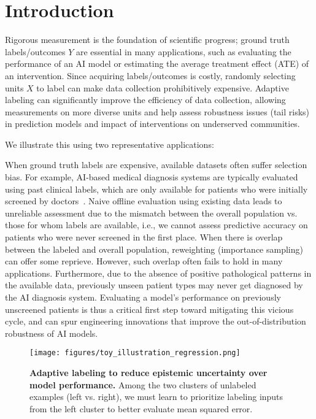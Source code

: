 
 
\section{Introduction}
\label{sec:introduction}


Rigorous measurement is the foundation of scientific progress;
ground truth labels/outcomes $Y$ are essential in many applications, such as evaluating the performance of an AI model or estimating the average treatment effect (ATE) of an intervention. 
Since acquiring labels/outcomes is costly, randomly selecting  units $X$ to label can make data collection prohibitively expensive. 
Adaptive labeling can significantly improve the efficiency of data collection,
allowing measurements on more diverse units
and help assess robustness issues (tail risks) in prediction models and impact of interventions on 
underserved communities.

We illustrate this using two representative applications:

 
\begin{example}
When ground truth labels are expensive, available datasets often suffer selection bias. For example, AI-based medical diagnosis systems are typically evaluated using past clinical labels, which are only available for patients who were initially screened by doctors~\citep{Institute03, Seyyed-KalantariZhMcChGh21,StrawWu22,MullainathanOb22,BalachandarGaPi24}.
Naive offline evaluation using existing data leads to unreliable assessment due to the mismatch between the overall population vs. those for whom labels are available, i.e., we cannot assess predictive accuracy on  patients who were never screened in the first place.  When there is overlap between 
the labeled and overall population, 
reweighting (importance sampling) can offer some reprieve. However, such overlap often fails to hold in many applications. Furthermore, 
due to the absence of positive pathological patterns in the available data, previously unseen patient types may never get diagnosed by the AI diagnosis system. Evaluating a model's performance on previously unscreened patients is thus a critical first step toward mitigating this vicious cycle, and can spur engineering innovations that improve the out-of-distribution robustness of AI models. 
\end{example}
    
\begin{figure}[t]
\centering
\texttt{[image: figures/toy\_illustration\_regression.png]}
\caption{\textbf{Adaptive labeling to reduce epistemic uncertainty over
model performance.}  Among the two clusters of unlabeled examples (left
vs. right), we must learn to prioritize labeling inputs from the left
cluster to better evaluate mean squared error.}
\label{fig:toy_illustration}
\end{figure}



